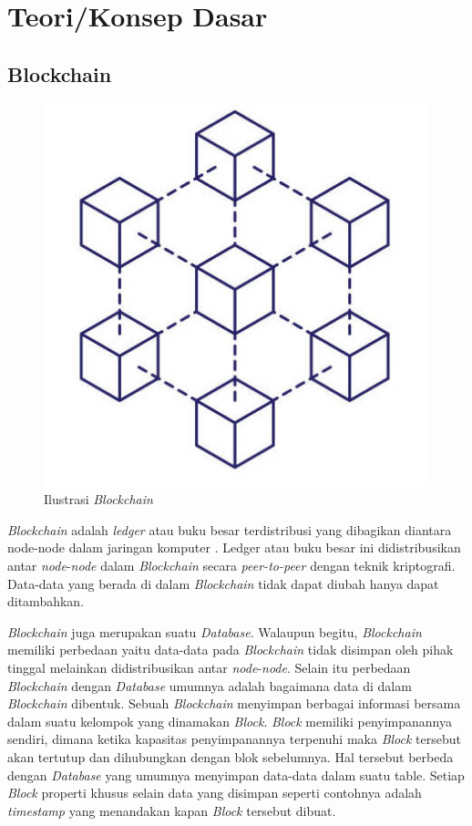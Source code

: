 \section{Teori/Konsep Dasar}

\subsection{Blockchain}

\begin{figure} [ht] \centering
  \includegraphics[scale=1.2]{gambar/img-blockchain-illustration.jpg}
  \caption{Ilustrasi \emph{Blockchain}}
  \label{fig:Metaverse}
\end{figure}

\emph{Blockchain} adalah \emph{ledger} atau buku besar terdistribusi yang dibagikan diantara node-node dalam jaringan komputer \parencite{LouiseAxon}. Ledger atau buku besar ini didistribusikan antar \emph{node}-\emph{node} dalam \emph{Blockchain} secara \emph{peer-to-peer} dengan teknik kriptografi. Data-data yang berada di dalam \emph{Blockchain} tidak dapat diubah hanya dapat ditambahkan. 

\emph{Blockchain} juga merupakan suatu \emph{Database}. Walaupun begitu, \emph{Blockchain} memiliki perbedaan yaitu data-data pada \emph{Blockchain} tidak disimpan oleh pihak tinggal melainkan didistribusikan antar \emph{node}-\emph{node}. Selain itu perbedaan \emph{Blockchain} dengan \emph{Database} umumnya adalah bagaimana data di dalam \emph{Blockchain} dibentuk. Sebuah \emph{Blockchain} menyimpan berbagai informasi bersama dalam suatu kelompok yang dinamakan \emph{Block}. \emph{Block} memiliki penyimpanannya sendiri, dimana ketika kapasitas penyimpanannya terpenuhi maka \emph{Block} tersebut akan tertutup dan dihubungkan dengan blok sebelumnya.
Hal tersebut berbeda dengan \emph{Database} yang umumnya menyimpan data-data dalam suatu table. Setiap \emph{Block} properti khusus selain data yang disimpan seperti contohnya adalah \emph{timestamp} yang menandakan kapan \emph{Block} tersebut dibuat.

